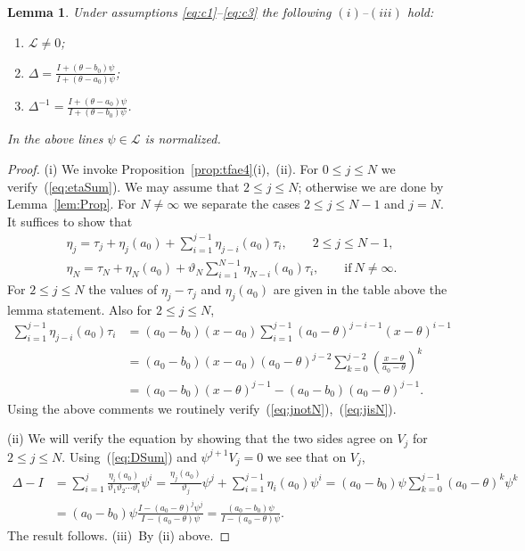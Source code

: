 \documentclass[pdftex]{sigma}
\numberwithin{equation}{section}
\newtheorem{Lemma}[Theorem]{Lemma}
\begin{document}
\begin{Lemma}\label{lem:deg} Under assumptions
\eqref{eq:c1}--\eqref{eq:c3} the following $(i)$--$(iii)$ hold:
\begin{enumerate}\itemsep=0pt
\item[$(i)$] $\mathcal L\not=0$;
\item[$(ii)$] $\Delta =\frac{I + (\theta- b_0)\psi}{I + (\theta-a_0)\psi}$;
\item[$(iii)$] $\Delta^{-1} =\frac{I + (\theta- a_0)\psi}{I + (\theta-b_0)\psi}$.
\end{enumerate}
In the above lines $\psi \in \mathcal L$ is normalized.
\end{Lemma}
\begin{proof} (i)
We invoke Proposition~\ref{prop:tfae4}(i),~(ii).
For $0 \leq j \leq N$ we verify~(\ref{eq:etaSum}).
We may assume that $2 \leq j \leq N$; otherwise we are done
by Lemma~\ref{lem:Prop}. For $N \not=\infty$ we separate
the cases $2\leq j\leq N-1$ and $j=N$.
It suffices to show that
\begin{gather}
\eta_j = \tau_j + \eta_j(a_0)+
\sum_{i=1}^{j-1} \eta_{j-i}(a_0)\tau_i,
\qquad 2 \leq j \leq N-1,\label{eq:jnotN}
\\
\eta_N = \tau_N + \eta_N(a_0)+ \vartheta_N \sum_{i=1}^{N-1}
\eta_{N-i}(a_0)\tau_i, \qquad
\text{if} \ N\not=\infty.
\label{eq:jisN}
\end{gather}
For $2 \leq j \leq N$ the values of $\eta_j-\tau_j$ and
$\eta_j(a_0)$ are given in the table above the lemma statement.
Also for $2 \leq j \leq N$,{\samepage
\begin{align*}
\sum_{i=1}^{j-1} \eta_{j-i}(a_0)\tau_i
&=(a_0-b_0)(x-a_0) \sum_{i=1}^{j-1} (a_0-\theta)^{j-i-1}(x-\theta)^{i-1}\\
&=(a_0-b_0)(x-a_0)(a_0-\theta)^{j-2} \sum_{k=0}^{j-2}\left(
\frac{x-\theta}{a_0-\theta}\right)^k\\
&= (a_0-b_0)(x-\theta)^{j-1} - (a_0-b_0)(a_0-\theta)^{j-1}.
\end{align*}
Using the above comments we routinely verify~(\ref{eq:jnotN}),~(\ref{eq:jisN}).}

(ii) We will verify the equation by showing
that the two sides agree on $V_j$ for $2 \leq j \leq N$.
Using~(\ref{eq:DSum}) and $\psi^{j+1}V_j=0$ we see that on $V_j$,
\begin{align*}
\Delta - I &= \sum_{i=1}^j \frac{\eta_i(a_0)}{\vartheta_1 \vartheta_2\cdots
\vartheta_i}\psi^i
= \frac{\eta_j(a_0)}{\vartheta_j} \psi^j + \sum_{i=1}^{j-1}
\eta_i(a_0) \psi^i
= (a_0-b_0) \psi \sum_{k=0}^{j-1} (a_0-\theta)^k \psi^k
\\
&= (a_0-b_0)\psi \frac{ I - (a_0-\theta)^j \psi^j}{I - (a_0-\theta) \psi}
= \frac{(a_0-b_0)\psi}{I - (a_0-\theta) \psi}.
\end{align*}
The result follows.
(iii)~By (ii) above.
\end{proof}
\end{document}
